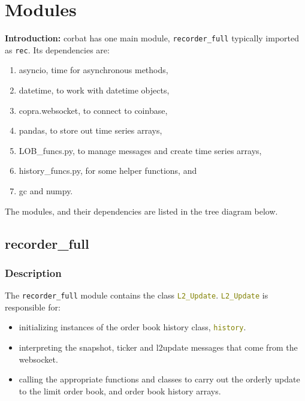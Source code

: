 \section{Modules}

\noindent\textbf{Introduction:} corbat has one main module, \texttt{recorder\_full} typically imported as \texttt{rec}. Its dependencies are:
\begin{enumerate}[noitemsep]
	\item asyncio, time for asynchronous methods,
	\item datetime, to work with datetime objects,
	\item copra.websocket, to connect to coinbase,
	\item pandas, to store out time series arrays, 
	\item LOB\_funcs.py, to manage messages and create time series arrays, 
	\item history\_funcs.py, for some helper functions, and 
	\item gc and numpy. 
\end{enumerate}
The modules, and their dependencies are listed in the tree diagram below.\\



\subsection{recorder\_full}
\subsubsection{Description}
The \texttt{recorder\_full} module contains the class \textcolor{olive}{\texttt{L2\_Update}}. \textcolor{olive}{\texttt{L2\_Update}} is responsible for:
\begin{itemize}[noitemsep]
	\item initializing instances of the order book history class, \textcolor{olive}{\texttt{history}}.
	\item interpreting the snapshot, ticker and l2update messages that come from the websocket.
	\item calling the appropriate functions and classes to carry out the orderly update to the limit order book, and order book history arrays.
\end{itemize}

